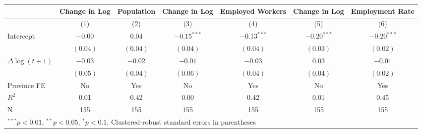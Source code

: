 
\begin{tabular}{l |c c| c c| c c }

 & Change in Log& Population & Change in Log& Employed Workers &Change in Log& Employment Rate \\
 \hline & (1) & (2)& (3) & (4) & (5) & (6) \\
\hline
Intercept & $-0.00$  & $0.04$   & $-0.15^{***}$ & $-0.13^{***}$ & $-0.20^{***}$ & $-0.20^{***}$ \\
            & $(0.04)$ & $(0.04)$ & $(0.04)$      & $(0.04)$      & $(0.03)$      & $(0.02)$      \\
$\Delta\log(t+1)$ & $-0.03$  & $-0.02$  & $-0.01$       & $-0.03$       & $0.03$        & $-0.01$       \\
            & $(0.05)$ & $(0.04)$ & $(0.06)$      & $(0.04)$      & $(0.04)$      & $(0.02)$      \\
\hline
Province FE & No                &Yes           & No   & Yes&No    &Yes                \\ 
\hline
$R^2$       & 0.01     & 0.42     & 0.00          & 0.42          & 0.01          & 0.45          \\
N           & 155      & 155      & 155           & 155           & 155           & 155           \\
\hline
\multicolumn{7}{l}{\scriptsize{$^{***}p<0.01$, $^{**}p<0.05$, $^*p<0.1$, Clustered-robust standard errors in parentheses}}
\end{tabular}
